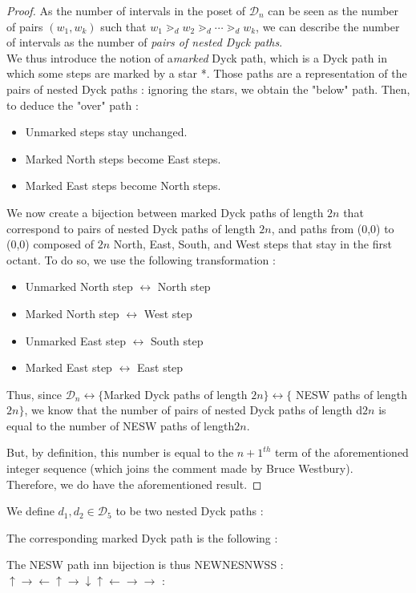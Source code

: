 \begin{proof}
    As the number of intervals in the poset of $\mathcal{D}_n$
    can be seen as the number of pairs $(w_1, w_k)$ such that
    $w_1 \gtrdot_d w_2 \gtrdot_d \cdots \gtrdot_d w_k$, we can
    describe the number of intervals as the number of
    \emph{pairs of nested Dyck paths}.\\
    We thus introduce the notion of a\emph{marked} Dyck path,
    which is a Dyck path in which some steps are marked by a star *.
    Those paths are a representation of the pairs of nested Dyck
    paths : ignoring the stars, we obtain the "below" path.
    Then, to deduce the "over" path :
    \begin{itemize}
        \item Unmarked steps stay unchanged.
        \item Marked North steps become East steps.
        \item Marked East steps become North steps.
    \end{itemize}
    We now create a bijection between marked Dyck paths of length
    $2n$ that correspond to pairs of nested Dyck paths of length
    $2n$, and paths from (0,0) to (0,0) composed of $2n$ North,
    East, South, and West steps that stay in the first octant.
    To do so, we use the following transformation :
    \begin{itemize}
        \item Unmarked North step $\longleftrightarrow$ North step
        \item Marked North step $\longleftrightarrow$ West step
        \item Unmarked East step $\longleftrightarrow$ South step
        \item Marked East step $\longleftrightarrow$ East step
    \end{itemize}
    Thus, since $\mathcal{D}_n \longleftrightarrow \{$Marked Dyck
    paths of length $2n\} \longleftrightarrow \{$ NESW paths of
    length $2n\}$, we know that the number of pairs of nested Dyck
    paths of length d$2n$ is equal to the number of NESW paths of
    length$2n$.

    But, by definition, this number is equal to the $n+1^{th}$ term
    of the aforementioned integer sequence (which joins the comment
    made by Bruce Westbury).\\
    Therefore, we do have the aforementioned result.
\end{proof}

\begin{example}[$n = 5$]
    We define $d_1, d_2 \in \mathcal{D}_5$ to be two nested Dyck
    paths :
    
    The corresponding marked Dyck path is the following :
    
    The NESW path inn bijection is thus NEWNESNWSS :
    $\uparrow \rightarrow \leftarrow \uparrow \rightarrow \downarrow
    \uparrow \leftarrow \rightarrow \rightarrow$ :
    
\end{example}


